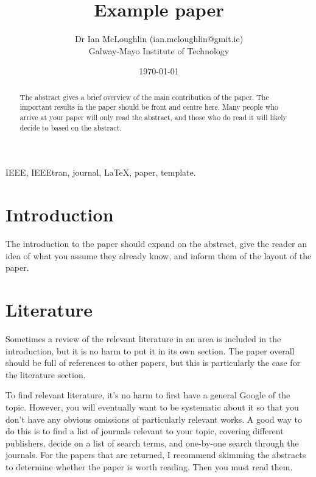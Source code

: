 \documentclass[journal]{IEEEtran}
\title{Example paper}
\author{Dr Ian McLoughlin (ian.mcloughlin@gmit.ie) \\ Galway-Mayo Institute of Technology}
\date{\today}
\begin{document}
  \maketitle

  \begin{abstract}
    The abstract gives a brief overview of the main contribution of the paper.
    The important results in the paper should be front and centre here.
    Many people who arrive at your paper will only read the abstract, and those
    who do read it will likely decide to based on the abstract.
  \end{abstract}

  \begin{IEEEkeywords}
    IEEE, IEEEtran, journal, \LaTeX, paper, template.
  \end{IEEEkeywords}


  \section{Introduction}
    The introduction to the paper should expand on the abstract, give the reader
    an idea of what you assume they already know, and inform them of the layout of
    the paper.

  \section{Literature}
    Sometimes a review of the relevant literature in an area is included in the
    introduction, but it is no harm to put it in its own section. The paper
    overall should be full of references to other papers, but this is particularly
    the case for the literature section.
    
    To find relevant literature, it's no harm to first have a general Google of
    the topic. However, you will eventually want to be systematic about it so
    that you don't have any obvious omissions of particularly relevant works.
    A good way to do this is to find a list of journals relevant to your topic,
    covering different publishers, decide on a list of search terms, and 
    one-by-one search through the journals. For the papers that are returned,
    I recommend skimming the abstracts to determine whether the paper is worth
    reading. Then you must read them.
\end{document}
